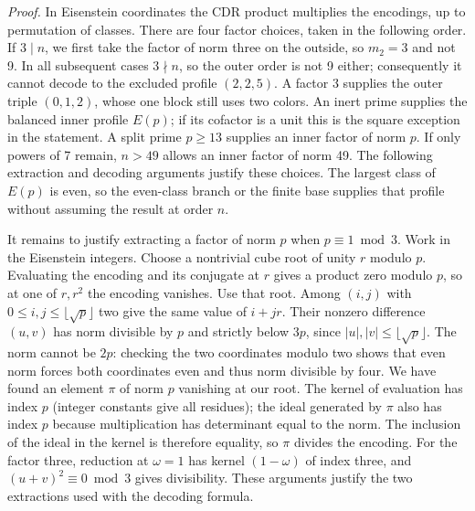 \documentclass[english,11pt,a4paper]{article}
\begin{document}
\emph{Proof.} In Eisenstein coordinates the CDR product multiplies the encodings, up to permutation of classes. There are four factor choices, taken in the following order. If \(3\mid n\), we first take the factor of norm three on the outside, so \(m_2=3\) and not 9. In all subsequent cases \(3\nmid n\), so the outer order is not 9 either; consequently it cannot decode to the excluded profile \((2,2,5)\). A factor 3 supplies the outer triple \((0,1,2)\), whose one block still uses two colors. An inert prime supplies the balanced inner profile \(E(p)\); if its cofactor is a unit this is the square exception in the statement. A split prime \(p\ge13\) supplies an inner factor of norm \(p\). If only powers of 7 remain, \(n>49\) allows an inner factor of norm 49. The following extraction and decoding arguments justify these choices. The largest class of \(E(p)\) is even, so the even-class branch or the finite base supplies that profile without assuming the result at order \(n\).

It remains to justify extracting a factor of norm \(p\) when \(p\equiv1\bmod3\). Work in the Eisenstein integers. Choose a nontrivial cube root of unity \(r\) modulo \(p\). Evaluating the encoding and its conjugate at \(r\) gives a product zero modulo \(p\), so at one of \(r,r^2\) the encoding vanishes. Use that root. Among \((i,j)\) with \(0\le i,j\le\lfloor\sqrt p\rfloor\) two give the same value of \(i+jr\). Their nonzero difference \((u,v)\) has norm divisible by \(p\) and strictly below \(3p\), since \(|u|,|v|\le\lfloor\sqrt p\rfloor\). The norm cannot be \(2p\): checking the two coordinates modulo two shows that even norm forces both coordinates even and thus norm divisible by four. We have found an element \(\pi\) of norm \(p\) vanishing at our root. The kernel of evaluation has index \(p\) (integer constants give all residues); the ideal generated by \(\pi\) also has index \(p\) because multiplication has determinant equal to the norm. The inclusion of the ideal in the kernel is therefore equality, so \(\pi\) divides the encoding. For the factor three, reduction at \(\omega=1\) has kernel \((1-\omega)\) of index three, and \((u+v)^2\equiv0\bmod3\) gives divisibility. These arguments justify the two extractions used with the decoding formula.
\end{document}
